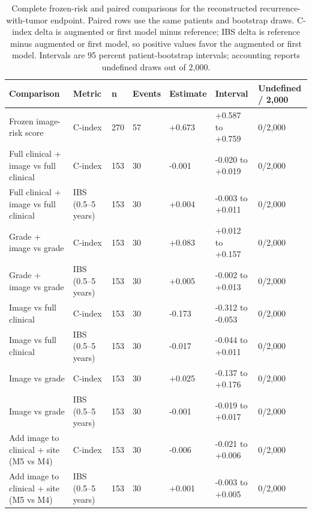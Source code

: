 \begin{table}[H]
\centering
\scriptsize
\caption{Complete frozen-risk and paired comparisons for the reconstructed recurrence-with-tumor endpoint. Paired rows use the same patients and bootstrap draws. C-index delta is augmented or first model minus reference; IBS delta is reference minus augmented or first model, so positive values favor the augmented or first model. Intervals are 95 percent patient-bootstrap intervals; accounting reports undefined draws out of 2,000.}
\label{tab:supp-outcome-reconstructed}
\begin{tabular}{@{}p{}p{}p{}p{}p{}p{}p{}@{}}
\toprule
Comparison & Metric & n & Events & Estimate & Interval & Undefined / 2,000 \\
\midrule
Frozen image-risk score & C-index & 270 & 57 & +0.673 & +0.587 to +0.759 & 0/2,000 \\
Full clinical + image vs full clinical & C-index & 153 & 30 & -0.001 & -0.020 to +0.019 & 0/2,000 \\
Full clinical + image vs full clinical & IBS (0.5--5 years) & 153 & 30 & +0.004 & -0.003 to +0.011 & 0/2,000 \\
Grade + image vs grade & C-index & 153 & 30 & +0.083 & +0.012 to +0.157 & 0/2,000 \\
Grade + image vs grade & IBS (0.5--5 years) & 153 & 30 & +0.005 & -0.002 to +0.013 & 0/2,000 \\
Image vs full clinical & C-index & 153 & 30 & -0.173 & -0.312 to -0.053 & 0/2,000 \\
Image vs full clinical & IBS (0.5--5 years) & 153 & 30 & -0.017 & -0.044 to +0.011 & 0/2,000 \\
Image vs grade & C-index & 153 & 30 & +0.025 & -0.137 to +0.176 & 0/2,000 \\
Image vs grade & IBS (0.5--5 years) & 153 & 30 & -0.001 & -0.019 to +0.017 & 0/2,000 \\
Add image to clinical + site (M5 vs M4) & C-index & 153 & 30 & -0.006 & -0.021 to +0.006 & 0/2,000 \\
Add image to clinical + site (M5 vs M4) & IBS (0.5--5 years) & 153 & 30 & +0.001 & -0.003 to +0.005 & 0/2,000 \\
\bottomrule
\end{tabular}
\end{table}
